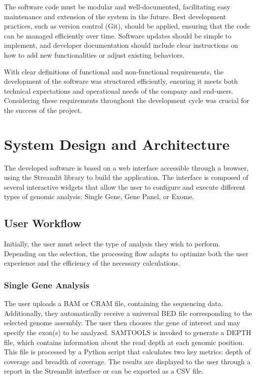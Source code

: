 The software code must be modular and well-documented, facilitating easy maintenance and extension of the system in the future. Best development practices, such as version control (Git), should be applied, ensuring that the code can be managed efficiently over time. Software updates should be simple to implement, and developer documentation should include clear instructions on how to add new functionalities or adjust existing behaviors.

With clear definitions of functional and non-functional requirements, the development of the software was structured efficiently, ensuring it meets both technical expectations and operational needs of the company and end-users. Considering these requirements throughout the development cycle was crucial for the success of the project.



\section{System Design and Architecture}

The developed software is based on a web interface accessible through a browser, using the Streamlit library to build the application. The interface is composed of several interactive widgets that allow the user to configure and execute different types of genomic analysis: Single Gene, Gene Panel, or Exome.

\subsection{User Workflow}

Initially, the user must select the type of analysis they wish to perform. Depending on the selection, the processing flow adapts to optimize both the user experience and the efficiency of the necessary calculations.

\subsubsection{\textbf{Single Gene Analysis}}

The user uploads a BAM or CRAM file, containing the sequencing data. Additionally, they automatically receive a universal BED file corresponding to the selected genome assembly. The user then chooses the gene of interest and may specify the exon(s) to be analyzed. SAMTOOLS is invoked to generate a DEPTH file, which contains information about the read depth at each genomic position. This file is processed by a Python script that calculates two key metrics: depth of coverage and breadth of coverage. The results are displayed to the user through a report in the Streamlit interface or can be exported as a CSV file.

